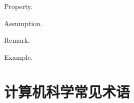 \documentclass[report, twoside, UTF8, AutoFakeBold = 1, AutoFakeSlant, zihao = -4]{config}
\begin{document}
\begin{property}\label{property1}
    Property.
\end{property}

\begin{assumption}\label{assumption1}
    Assumption.
\end{assumption}

\begin{remark}\label{remark1}
    Remark.
\end{remark}

\begin{example}\label{example1}
    Example.
\end{example}


\begin{references}
\end{references}


\StartAppendix %

\chapter{计算机科学常见术语}
\label{tab:appendix-table}
\end{document}

